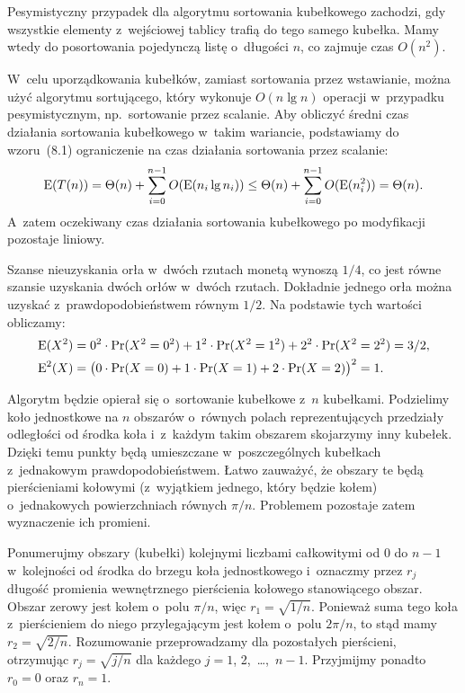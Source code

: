 \exercise %
Pesymistyczny przypadek dla algorytmu sortowania kubełkowego zachodzi, gdy wszystkie elementy z~wejściowej tablicy trafią do tego samego kubełka. Mamy wtedy do posortowania pojedynczą listę o~długości $n$, co zajmuje czas $O(n^2)$.

W~celu uporządkowania kubełków, zamiast sortowania przez wstawianie, można użyć algorytmu sortującego, który wykonuje $O(n\lg n)$ operacji w~przypadku pesymistycznym, np.\ sortowanie przez scalanie. Aby obliczyć średni czas działania sortowania kubełkowego w~takim wariancie, podstawiamy do wzoru~(8.1) ograniczenie na czas działania sortowania przez scalanie:
\[
	\operatorname{E}(T(n)) = \Theta(n)+\sum_{i=0}^{n-1}O(\operatorname{E}(n_i\lg n_i)) \le \Theta(n)+\sum_{i=0}^{n-1}O(\operatorname{E}(n_i^2)) = \Theta(n).
\]
A~zatem oczekiwany czas działania sortowania kubełkowego po modyfikacji pozostaje liniowy.

\exercise %
Szanse nieuzyskania orła w~dwóch rzutach monetą wynoszą $1/4$, co jest równe szansie uzyskania dwóch orłów w~dwóch rzutach. Dokładnie jednego orła można uzyskać z~prawdopodobieństwem równym $1/2$. Na podstawie tych wartości obliczamy:
\begin{align*}
	\operatorname{E}(X^2) &= 0^2\cdot\Pr(X^2=0^2)+1^2\cdot\Pr(X^2=1^2)+2^2\cdot\Pr(X^2=2^2) = 3/2, \\
	\operatorname{E}^2(X) &= \bigl(0\cdot\Pr(X=0)+1\cdot\Pr(X=1)+2\cdot\Pr(X=2)\bigr)^2 = 1.
\end{align*}

\exercise %
Algorytm będzie opierał się o~sortowanie kubełkowe z~$n$ kubełkami. Podzielimy koło jednostkowe na $n$ obszarów o~równych polach reprezentujących przedziały odległości od środka koła i~z~każdym takim obszarem skojarzymy inny kubełek. Dzięki temu punkty będą umieszczane w~poszczególnych kubełkach z~jednakowym prawdopodobieństwem. Łatwo zauważyć, że obszary te będą pierścieniami kołowymi (z~wyjątkiem jednego, który będzie kołem) o~jednakowych powierzchniach równych $\pi/n$. Problemem pozostaje zatem wyznaczenie ich promieni.

Ponumerujmy obszary (kubełki) kolejnymi liczbami całkowitymi od 0 do $n-1$ w~kolejności od środka do brzegu koła jednostkowego i~oznaczmy przez $r_j$ długość promienia wewnętrznego pierścienia kołowego stanowiącego  obszar. Obszar zerowy jest kołem o~polu $\pi/n$, więc $r_1=\sqrt{1/n}$. Ponieważ suma tego koła z~pierścieniem do niego przylegającym jest kołem o~polu $2\pi/n$, to stąd mamy $r_2=\sqrt{2/n}$. Rozumowanie przeprowadzamy dla pozostałych pierścieni, otrzymując $r_j=\sqrt{j/n}$ dla każdego $j=1$, 2,~\dots,~$n-1$. Przyjmijmy ponadto $r_0=0$ oraz $r_n=1$.

